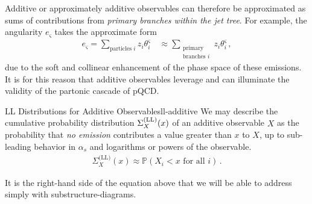     Additive or approximately additive observables can therefore be approximated as sums of contributions from \emph{primary branches within the jet tree}.
    For example, the angularity \(e_\varsigma\) takes the approximate form
    \begin{align}
        e_\varsigma
        =
        \sum_{\text{particles } i}
            z_i \theta_i^\varsigma
        \quad
        \approx
        \sum_{\substack{\text{primary}\\\text{branches } i}}
            z_i \theta_i^\varsigma
        \,,
    \end{align}
    due to the soft and collinear enhancement of the phase space of these emissions.
    It is for this reason that additive observables leverage and can illuminate the validity of the partonic cascade of pQCD.



\begin{proposition}{LL Distributions for Additive Observables}{ll-additive}
    We may describe the  cumulative probability distribution \(\Sigma^{\rm(LL)}_X(x)\) of an additive observable \(X\) as the probability that \textit{no emission} contributes a value greater than \(x\) to \(X\), up to sub-leading behavior in \(\alpha_s\) and logarithms or powers of the observable.
    \begin{align}
        \label{eq:ll-additive}
        \Sigma^{\text{(LL)}}_X(x) \approx \mathbb{P}(X_i < x \text{ for all } i)
        \,.
    \end{align}

    It is the right-hand side of the equation above that we will be able to address simply with \glspl{substructure-diagram}.
\end{proposition}



